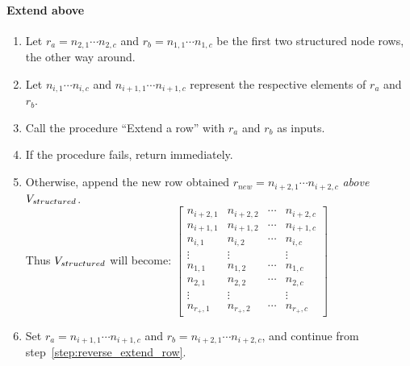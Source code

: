 \paragraph{Extend above}
\begin{enumerate}[resume]
\item \label{step:init_reverse_row} Let $r_a = n_{2,1} \cdots n_{2,c}$ and $r_b = n_{1,1} \cdots n_{1,c}$ be the first two structured node rows, the other way around.
\item \label{step:reverse_extend_row} Let $n_{i,1} \cdots n_{i,c}$ and $n_{i+1,1} \cdots n_{i+1,c}$ represent the respective elements of $r_a$ and $r_b$.
\item Call the procedure ``Extend a row'' with $r_a$ and $r_b$ as inputs.
\item If the procedure fails, return immediately.
\item Otherwise, append the new row obtained $r_{new} = n_{i+2,1} \cdots n_{i+2,c}$ \emph{above} $V_{structured}$.\\
Thus $V_{structured}$ will become:
$\begin{bmatrix}
	n_{i+2,1} & n_{i+2,2} & \cdots  & n_{i+2,c} \\
	n_{i+1,1} & n_{i+1,2} & \cdots  & n_{i+1,c} \\
	n_{i,1}   & n_{i,2}   & \cdots  & n_{i,c}   \\
	\vdots    & \vdots    &         & \vdots    \\
	n_{1,1}   & n_{1,2}   & \cdots  & n_{1,c}   \\
	n_{2,1}   & n_{2,2}   & \cdots  & n_{2,c}   \\
	\vdots    & \vdots    &         & \vdots    \\
	n_{r_+,1} & n_{r_+,2} & \cdots  & n_{r_+,c}
	\end{bmatrix}$
\item Set $r_a = n_{i+1,1} \cdots n_{i+1,c}$ and $r_b = n_{i+2,1} \cdots n_{i+2,c}$, and continue from step~\ref{step:reverse_extend_row}.
\end{enumerate}